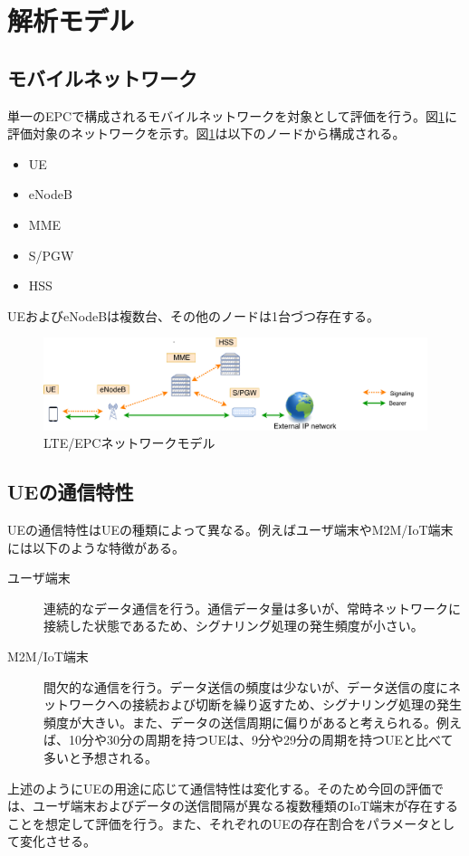 \documentclass[a4j]{ujarticle}
\begin{document}
\clearpage

\section{解析モデル}
\subsection{モバイルネットワーク}
単一のEPCで構成されるモバイルネットワークを対象として評価を行う。図\ref{networkmodel}に評価対象のネットワークを示す。図\ref{networkmodel}は以下のノードから構成される。
\begin{itemize}
  \item UE
  \item eNodeB
  \item MME
  \item S/PGW
	\item HSS
\end{itemize}
UEおよびeNodeBは複数台、その他のノードは1台づつ存在する。
\begin{figure}[htbp]
	\centering
	\includegraphics[width=0.7\hsize]{networkmodel.pdf}
  \caption{LTE/EPCネットワークモデル}
	\label{networkmodel}
\end{figure}
\subsection{UEの通信特性}
UEの通信特性はUEの種類によって異なる。例えばユーザ端末やM2M/IoT端末には以下のような特徴がある。
\begin{description}
  \item[ユーザ端末] 連続的なデータ通信を行う。通信データ量は多いが、常時ネットワークに接続した状態であるため、シグナリング処理の発生頻度が小さい。
  \item[M2M/IoT端末] 間欠的な通信を行う。データ送信の頻度は少ないが、データ送信の度にネットワークへの接続および切断を繰り返すため、シグナリング処理の発生頻度が大きい。また、データの送信周期に偏りがあると考えられる。例えば、10分や30分の周期を持つUEは、9分や29分の周期を持つUEと比べて多いと予想される。
\end{description}
上述のようにUEの用途に応じて通信特性は変化する。そのため今回の評価では、ユーザ端末およびデータの送信間隔が異なる複数種類のIoT端末が存在することを想定して評価を行う。また、それぞれのUEの存在割合をパラメータとして変化させる。
\end{document}
